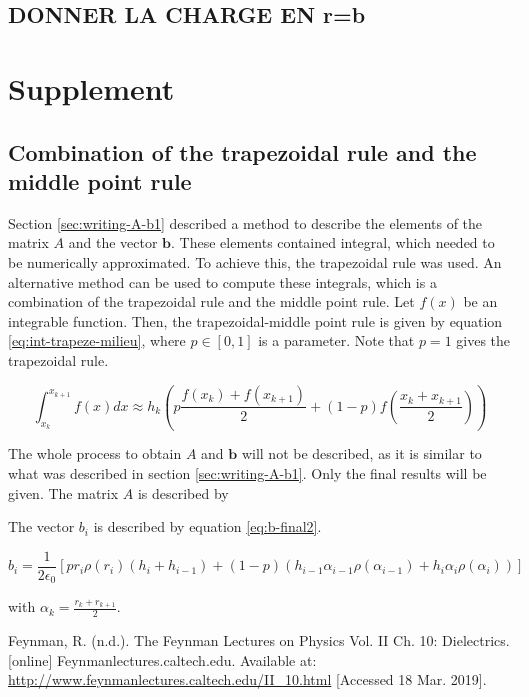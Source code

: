 \documentclass[a4paper,12pt,twoside]{article}
\newcommand{\mbf}[1]{\mathbf{#1}} %
\newcommand{\bracket}[1]{\left(#1\right)}
\newcommand{\sqbracket}[1]{\left[#1\right]}
\begin{document}
  \subsection{DONNER LA CHARGE EN r=b} \lipsum[1-1]




  \section{Supplement} %
    \subsection{Combination of the trapezoidal rule and the middle point rule}
      Section \ref{sec:writing-A-b1} described a method to describe the elements of the matrix $A$ and the vector $\mbf{b}$.
      These elements contained integral, which needed to be numerically approximated.
      To achieve this, the trapezoidal rule was used.
      An alternative method can be used to compute these integrals, which is a combination of the trapezoidal rule and the middle point rule.
      Let $f\bracket{x}$ be an integrable function.
      Then, the trapezoidal-middle point rule is given by equation \eqref{eq:int-trapeze-milieu}, where $p\in[0,1]$ is a parameter. Note that $p=1$ gives the trapezoidal rule.

      \begin{equation}
        \int_{x_k}^{x_{k+1}}f\bracket{x}dx \approx h_k\bracket{p\frac{f\bracket{x_k} + f\bracket{x_{k+1}}}{2} + \bracket{1-p}f\bracket{\frac{x_k + x_{k+1}}{2}}}
        \label{eq:int-trapeze-milieu}
      \end{equation}

      The whole process to obtain $A$ and $\mbf{b}$ will not be described, as it is similar to what was described in section \ref{sec:writing-A-b1}.
      Only the final results will be given.
      The matrix $A$ is described by %

      The vector $b_i$ is described by equation \eqref{eq:b-final2}.

      \begin{equation}
        \boxed{b_i = \frac{1}{2\epsilon_0}\sqbracket{pr_i\rho\bracket{r_i}\bracket{h_i + h_{i-1}} + \bracket{1-p}\bracket{h_{i-1}\alpha_{i-1}\rho\bracket{\alpha_{i-1}} + h_i\alpha_i\rho\bracket{\alpha_i}}}}
        \label{eq:b-final2}
      \end{equation}

      with $\alpha_k = \frac{r_k + r_{k+1}}{2}$.

  \begin{thebibliography}{99}
     Feynman, R. (n.d.). The Feynman Lectures on Physics Vol. II Ch. 10: Dielectrics. [online] Feynmanlectures.caltech.edu. Available at: \url{http://www.feynmanlectures.caltech.edu/II_10.html} [Accessed 18 Mar. 2019].
  \end{thebibliography}
\end{document}

